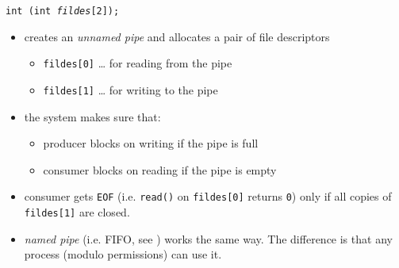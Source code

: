


\begin{slide}
\texttt{int (int \emph{fildes}[2]);}
\begin{itemize}
\item creates an \emph{unnamed pipe} and allocates a pair of file descriptors
    \begin{itemize}
    \item \texttt{fildes[0]} \dots{} for reading from the pipe
    \item \texttt{fildes[1]} \dots{} for writing to the pipe
    \end{itemize}
\item the system makes sure that:
    \begin{itemize}
    \item producer blocks on writing if the pipe is full
    \item consumer blocks on reading if the pipe is empty
    \end{itemize}
\item consumer gets \texttt{EOF} (i.e. \texttt{read()} on \texttt{fildes[0]}
returns \texttt{0}) only if all copies of \texttt{fildes[1]} are closed.
\item \emph{named pipe} (i.e. FIFO, see ) works the same way.
The difference is that any process (modulo permissions) can use it.
\end{itemize}
\end{slide}


